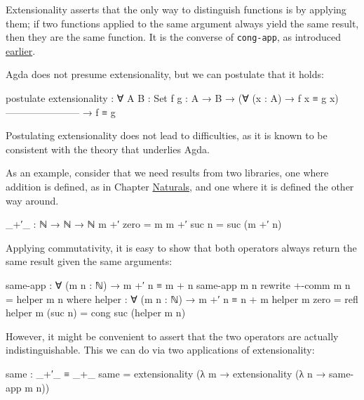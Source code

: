 Extensionality asserts that the only way to distinguish functions is by
applying them; if two functions applied to the same argument always
yield the same result, then they are the same function. It is the
converse of \texttt{cong-app}, as introduced
\protect\hyperlink{Equality-cong}{earlier}.

Agda does not presume extensionality, but we can postulate that it
holds:

\begin{fence}
\begin{code}
postulate
  extensionality : ∀ {A B : Set} {f g : A → B}
    → (∀ (x : A) → f x ≡ g x)
      -----------------------
    → f ≡ g
\end{code}
\end{fence}

Postulating extensionality does not lead to difficulties, as it is known
to be consistent with the theory that underlies Agda.

As an example, consider that we need results from two libraries, one
where addition is defined, as in Chapter
\protect\hyperlink{Naturals}{Naturals}, and one where it is defined the
other way around.

\begin{fence}
\begin{code}
_+′_ : ℕ → ℕ → ℕ
m +′ zero  = m
m +′ suc n = suc (m +′ n)
\end{code}
\end{fence}

Applying commutativity, it is easy to show that both operators always
return the same result given the same arguments:

\begin{fence}
\begin{code}
same-app : ∀ (m n : ℕ) → m +′ n ≡ m + n
same-app m n rewrite +-comm m n = helper m n
  where
  helper : ∀ (m n : ℕ) → m +′ n ≡ n + m
  helper m zero    = refl
  helper m (suc n) = cong suc (helper m n)
\end{code}
\end{fence}

However, it might be convenient to assert that the two operators are
actually indistinguishable. This we can do via two applications of
extensionality:

\begin{fence}
\begin{code}
same : _+′_ ≡ _+_
same = extensionality (λ m → extensionality (λ n → same-app m n))
\end{code}
\end{fence}

